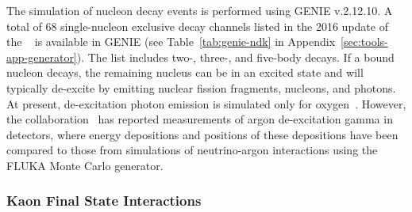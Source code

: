 The simulation of nucleon decay events is performed using GENIE v.2.12.10. 
A total of 68 single-nucleon exclusive decay channels listed in the 2016 update of the ~\cite{Tanabashi:2018oca} %
is available in GENIE (see Table~\ref{tab:genie-ndk} 
in Appendix~\ref{sec:tools-app-generator}). The list includes two-, three-, and five-body decays. 
If a bound nucleon decays, the remaining nucleus can be in an excited state and will typically de-excite by emitting nuclear fission fragments, nucleons, and photons. At present, de-excitation photon emission is simulated only for oxygen~\cite{Andreopoulos:2015wxa}.  However, the \argoneut collaboration~\cite{Acciarri:2018myr} has reported measurements of argon de-excitation gamma in \lartpc detectors,
where energy depositions and positions of these depositions have been compared to those from simulations of neutrino-argon interactions using the FLUKA Monte Carlo generator.

\subsubsection{Kaon Final State Interactions}
\label{sec:final-state-interactions}

